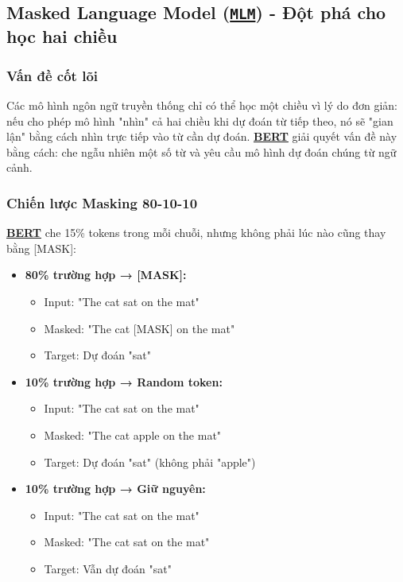 \subsection{Masked Language Model (\hyperref[acro:mlm]{\texttt{MLM}}) - Đột phá cho học hai chiều}
\label{ssec:mlm}

\subsubsection{Vấn đề cốt lõi}
Các mô hình ngôn ngữ truyền thống chỉ có thể học một chiều vì lý do đơn giản: nếu cho phép mô hình "nhìn" cả hai chiều khi dự đoán từ tiếp theo, nó sẽ "gian lận" bằng cách nhìn trực tiếp vào từ cần dự đoán.
\hyperref[acro:bert]{\textbf{BERT}} giải quyết vấn đề này bằng cách: che ngẫu nhiên một số từ và yêu cầu mô hình dự đoán chúng từ ngữ cảnh.
\subsubsection{Chiến lược Masking 80-10-10}
\hyperref[acro:bert]{\textbf{BERT}} che 15\% tokens trong mỗi chuỗi, nhưng không phải lúc nào cũng thay bằng [MASK]:

\begin{itemize}
    \item \textbf{80\% trường hợp → [MASK]:} 
    \begin{itemize}
        \item Input: "The cat sat on the mat"
        \item Masked: "The cat [MASK] on the mat"
        \item Target: Dự đoán "sat"
    \end{itemize}
    
    \item \textbf{10\% trường hợp → Random token:}
    \begin{itemize}
        \item Input: "The cat sat on the mat"
        \item Masked: "The cat apple on the mat"
        \item Target: Dự đoán "sat" (không phải "apple")
    \end{itemize}
    
    \item \textbf{10\% trường hợp → Giữ nguyên:}
    \begin{itemize}
        \item Input: "The cat sat on the mat"
        \item Masked: "The cat sat on the mat"
        \item Target: Vẫn dự đoán "sat"
    \end{itemize}
\end{itemize}

